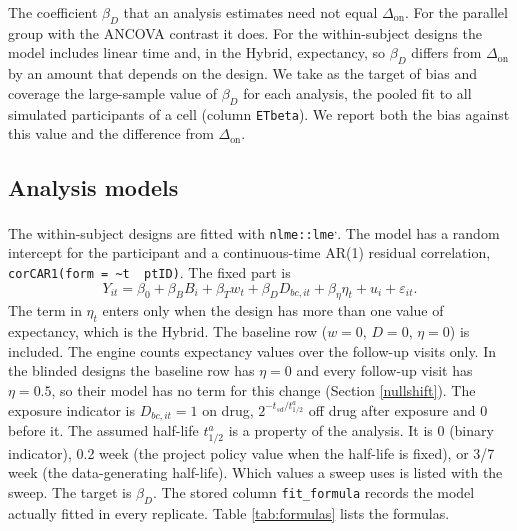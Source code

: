 \documentclass[
  11pt,
]{article}
\begin{document}
The coefficient \(\beta_D\) that an analysis estimates need not equal \(\Delta_{\mathrm{on}}\). For the parallel group with the ANCOVA contrast it does. For the within-subject designs the model includes linear time and, in the Hybrid, expectancy, so \(\beta_D\) differs from \(\Delta_{\mathrm{on}}\) by an amount that depends on the design. We take as the target of bias and coverage the large-sample value of \(\beta_D\) for each analysis, the pooled fit to all simulated participants of a cell (column \texttt{ETbeta}). We report both the bias against this value and the difference from \(\Delta_{\mathrm{on}}\).

\subsection{Analysis models}\label{analysis-models}

The within-subject designs are fitted with \texttt{nlme::lme}\textsuperscript{,}. The model has a random intercept for the participant and a continuous-time AR(1) residual correlation, \texttt{corCAR1(form\ =\ \textasciitilde{}t\ \textbar{}\ ptID)}. The fixed part is
\[Y_{it} = \beta_0 + \beta_B B_i + \beta_T w_t + \beta_D D_{bc,it} + \beta_\eta \eta_t + u_i + \varepsilon_{it}.\]
The term in \(\eta_t\) enters only when the design has more than one value of expectancy, which is the Hybrid. The baseline row (\(w = 0\), \(D = 0\), \(\eta = 0\)) is included. The engine counts expectancy values over the follow-up visits only. In the blinded designs the baseline row has \(\eta = 0\) and every follow-up visit has \(\eta = 0.5\), so their model has no term for this change (Section \ref{nullshift}). The exposure indicator is \(D_{bc,it} = 1\) on drug, \(2^{-t_{sd}/t^a_{1/2}}\) off drug after exposure and 0 before it. The assumed half-life \(t^a_{1/2}\) is a property of the analysis. It is 0 (binary indicator), 0.2 week (the project policy value when the half-life is fixed), or 3/7 week (the data-generating half-life). Which values a sweep uses is listed with the sweep. The target is \(\beta_D\). The stored column \texttt{fit\_formula} records the model actually fitted in every replicate. Table \ref{tab:formulas} lists the formulas.
\end{document}

